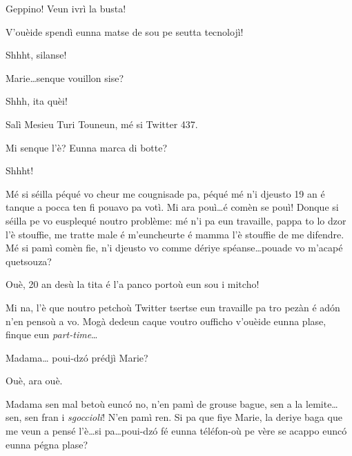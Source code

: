 \begin{drama}
\Mariespeaks{} Geppino! Veun ivrì la busta!



\Turispeaks{} V'ouèide spendì eunna matse de sou pe seutta tecnolojì!

\Mariespeaks Shhht, silanse!


\Turispeaks{} Marie\ldots senque vouillon sise?

\Mariespeaks Shhh, ita quèi!

\Twitterspeaks Salì Mesieu Turi Touneun, mé si Twitter 437.

\Turispeaks{} Mi senque l'è? Eunna marca di botte?

\Mariespeaks Shhht!

\Twitterspeaks{} Mé si séilla péqué vo cheur me cougnisade pa, péqué mé n'i djeusto 19 an é tanque a pocca ten fi pouavo pa votì.  Mi ara pouì\ldots é comèn se pouì! Donque si séilla pe vo eusplequé noutro problème: mé n'i pa eun travaille, pappa to lo dzor l'è stouffie, me tratte male é m'euncheurte é mamma l’è stouffie de me difendre. Mé si pamì comèn fie, n'i djeusto vo comme dériye spéanse\ldots pouade vo m'acapé quetsouza?

\Tanteunspeaks{} Ouè,  20 an desù la tita é l’a panco portoù eun sou i mitcho!

\Alicespeaks{} Mi na, l'è que noutro petchoù Twitter tsertse eun travaille pa tro pezàn é ad\'on n’en pensoù a vo. Mogà dedeun caque voutro oufficho v'ouèide eunna plase, finque eun \textit{part-time}\ldots

\Turispeaks Madama\ldots {} poui-dz\'o prédjì Marie?

\Mariespeaks Ouè, ara ouè.

\Turispeaks{} Madama sen mal betoù eunc\'o no, n'en pamì de grouse bague, sen a la lemite\ldots sen, sen fran i \textit{sgoccioli}! N'en pamì ren.  Si pa que fiye Marie, la deriye baga que me veun a pensé l'è\ldots si pa\ldots poui-dz\'o fé eunna téléfon-où pe vère se acappo eunc\'o eunna pégna plase?


\end{drama}
